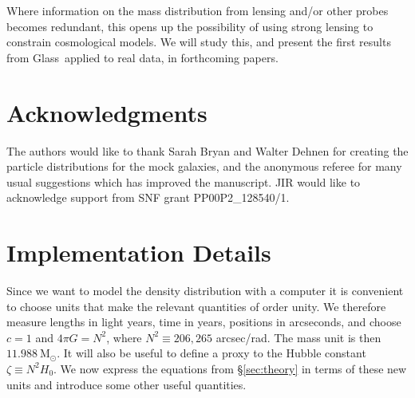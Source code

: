 \documentclass[galley,usenatbib]{mn2e}
\newcommand{\Glass}{{\sc Glass}}
\newcommand{\Msun}{\ensuremath{\mathrm{M}_\odot}}
\newcommand{\secref}[1] {\S\ref{#1}}
\begin{document}
Where information on the mass distribution from lensing and/or other probes
becomes redundant, this opens up the possibility of using strong lensing to
constrain cosmological models. We will study this, and present the first
results from \Glass\ applied to real data, in forthcoming papers.

\section{Acknowledgments}\label{sec:Acknowledgements}

The authors would like to thank Sarah Bryan and Walter Dehnen for creating the
particle distributions for the mock galaxies, and the anonymous referee for
many usual suggestions which has improved the manuscript. JIR would like to
acknowledge support from SNF grant PP00P2\_128540/1.




\appendix

\section{Implementation Details}

Since we want to model the density distribution with a computer it is
convenient to choose units that make the relevant quantities of order unity.
We therefore measure lengths in light years, time in years, positions in
arcseconds, and choose $c=1$ and $4\pi G = N^2$, where $N^2 \equiv 206,265$
arcsec/rad. The mass unit is then $11.988\ \Msun$. It will also be useful to
define a proxy to the Hubble constant $\zeta \equiv N^2 H_0$. We now express
the equations from \secref{sec:theory} in terms of these new units and
introduce some other useful quantities.
\end{document}
